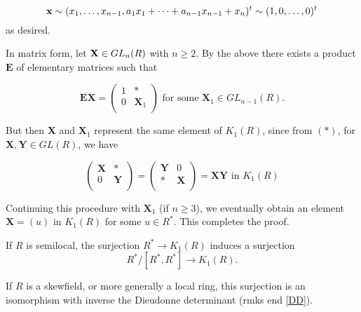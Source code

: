 $$\textbf x \sim (x_1, \dots, x_{n-1}, a_1x_1+\dots+a_{n-1}x_{n-1}+x_n)^t \sim (1,0,\dots, 0)^t$$
as desired.

In matrix form, let $\textbf X\in GL_n(R)$ with $n\geq 2$. By the above there exists a product $\mathbf E$ of elementary matrices such that

$$\mathbf{EX} = \left( \begin{array}{cc}
1 & *\\
0 & \mathbf X_1 \\ \end{array}\right) \text{ for some }\mathbf X_1\in GL_{n-1}(R).$$

But then $\mathbf X$ and $\mathbf X_1$ represent the same element of $K_1(R)$, since from $(*)$, for $\mathbf {X,Y}\in GL(R)$, we have

$$\left( \begin{array}{cc}
\mathbf X & *\\
0 & \mathbf Y\\ \end{array}\right)
=
\left( \begin{array}{cc}
\mathbf Y& 0\\
* & \mathbf X\\ \end{array}\right)
=
\mathbf{XY} \text{ in } K_1(R)$$



Continuing this procedure with $\mathbf X_1$ (if $n\geq 3$), we eventually obtain an element $\mathbf X = (u)$ in $K_1(R)$ for some $u\in R^*$. This completes the proof.




If $R$ is semilocal, the surjection $R^* \rightarrow K_1(R)$ induces a surjection
$$R^*/ [R^* , R^*] \rightarrow K_1(R).$$

If $R$ is a skewfield, or more generally a local ring, this surjection is an isomorphism with inverse the Dieudonne determinant (rmks end \ref{DD}).

